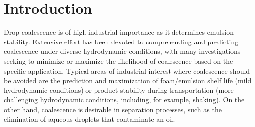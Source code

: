 \documentclass[twoside,twocolumn,9pt]{article}
\begin{document}
\renewcommand*\rmdefault{bch}\normalfont\upshape
\rmfamily
\section*{}
\vspace{-1cm}


\begin{NoHyper}
\end{NoHyper}




\section{Introduction}

Drop coalescence is of high industrial importance as it determines emulsion stability. Extensive effort has been devoted to comprehending and predicting coalescence under diverse hydrodynamic conditions, with many investigations seeking to minimize or maximize the likelihood of coalescence based on the specific application. Typical areas of industrial interest where coalescence should be avoided are the prediction and maximization of foam/emulsion shelf life (mild hydrodynamic conditions) or product stability during transportation (more challenging hydrodynamic conditions, including, for example, shaking). On the other hand, coalescence is desirable in separation processes, such as the elimination of aqueous droplets that contaminate an oil. 
\end{document}
